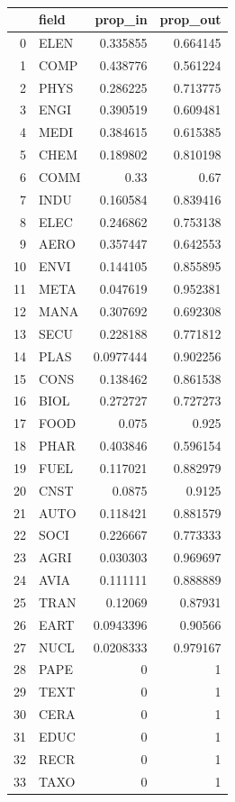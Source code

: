 \documentclass[12pt,letterpaper]{article}
\begin{document}
\begin{table}[tbp]
\scriptsize
\centering
\begin{tabular}{rlrr}
\hline
   & field & prop\_in  & prop\_out \\ \hline
0  & ELEN  & 0.335855  & 0.664145  \\
1  & COMP  & 0.438776  & 0.561224  \\
2  & PHYS  & 0.286225  & 0.713775  \\
3  & ENGI  & 0.390519  & 0.609481  \\
4  & MEDI  & 0.384615  & 0.615385  \\
5  & CHEM  & 0.189802  & 0.810198  \\
6  & COMM  & 0.33      & 0.67      \\
7  & INDU  & 0.160584  & 0.839416  \\
8  & ELEC  & 0.246862  & 0.753138  \\
9  & AERO  & 0.357447  & 0.642553  \\
10 & ENVI  & 0.144105  & 0.855895  \\
11 & META  & 0.047619  & 0.952381  \\
12 & MANA  & 0.307692  & 0.692308  \\
13 & SECU  & 0.228188  & 0.771812  \\
14 & PLAS  & 0.0977444 & 0.902256  \\
15 & CONS  & 0.138462  & 0.861538  \\
16 & BIOL  & 0.272727  & 0.727273  \\
17 & FOOD  & 0.075     & 0.925     \\
18 & PHAR  & 0.403846  & 0.596154  \\
19 & FUEL  & 0.117021  & 0.882979  \\
20 & CNST  & 0.0875    & 0.9125    \\
21 & AUTO  & 0.118421  & 0.881579  \\
22 & SOCI  & 0.226667  & 0.773333  \\
23 & AGRI  & 0.030303  & 0.969697  \\
24 & AVIA  & 0.111111  & 0.888889  \\
25 & TRAN  & 0.12069   & 0.87931   \\
26 & EART  & 0.0943396 & 0.90566   \\
27 & NUCL  & 0.0208333 & 0.979167  \\
28 & PAPE  & 0         & 1         \\
29 & TEXT  & 0         & 1         \\
30 & CERA  & 0         & 1         \\
31 & EDUC  & 0         & 1         \\
32 & RECR  & 0         & 1         \\
33 & TAXO  & 0         & 1         \\ \hline
\end{tabular}
\caption{}
\label{tab:9}
\end{table}
\end{document}
